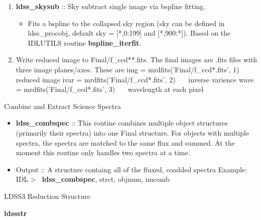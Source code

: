 \documentclass[11pt,letterpaper,dvips]{article}
\begin{document}
\begin{enumerate}
\begin{itemize}
\begin{enumerate}
	\item {\bf ldss\_skysub} :: Sky subtract single image via
	bspline fitting.
	    \begin{itemize}
	      \item Fits a bspline to the collapsed sky region (sky can
               be defined in ldss\_procobj, default sky = [*,0:199] and
               [*,900:*]).  Based on the IDLUTILS routine {\bf bspline\_iterfit}.
	    \end{itemize}

	\item Write reduced image to Final/f\_ccd**.fits.  The final images
	  are .fits files with three image planes/axes.  These are
	        img  = mrdfits('Final/f\_ccd*.fits', 1)~~~ reduced image  
	        ivar = mrdfits('Final/f\_ccd*.fits', 2)~~~ inverse varience  
	        wave = mrdfits('Final/f\_ccd*.fits', 3)~~~ wavelength at each pixel  


        \end{enumerate}
	\end{itemize}

{\Large \bf \item Combine and Extract Science Spectra }

    \begin{itemize}
	\item {\bf ldss\_combspec} :: This routine combines multiple object
	structures (primarily their spectra) into one Final structure. 
	For objects with multiple
	spectra, the spectra are matched to the same flux and summed.  At
	the moment this routine only handles two spectra at a time.  \\
	\item Output :: A structure containg all of the fluxed, coadded spectra
         \quad Example: IDL$> \;$ {\bf ldss\_combspec}, strct, objnum, imcomb\\
  \end{itemize}



\clearpage
{\Large \bf \item LDSS3 Reduction Structure }
	\begin{center}
	{\Large {\bf ldssstr}}
	\end{center}


\end{enumerate}
\end{document}
